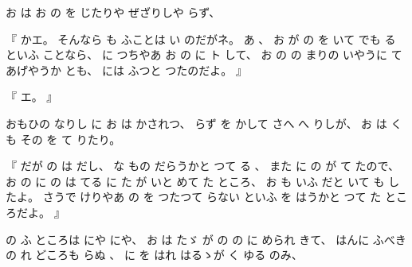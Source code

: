 %
お
は
お
の
を
じたりや
ぜざりしや
らず、

%
『
かエ。
%
そんなら
も
ふことは
い
のだがネ。
%
あ
、
%
お
が
の
を
いて
でも
る
といふ
ことなら、
%
に
つちやあ
お
の
に
ト
して、
%
お
の
の
まりの
いやうに
て
あげやうか
とも、
には
ふつと
つたのだよ。
』

%
『
エ。
』

%
おもひの
なりし
に
お
は
かされつ、
%
らず
を%
かして
さへ
へ
りしが、
%
お
は
くも
その
を
て
りたり。

%
『
だが
の
は
だし、%
%
な
もの
だらうかと
つて
る
、
%
また
に
の
が
て
たので、
%
お
の
に
の
は
てる
に
た
が
いと
めて
た
ところ、
%
お
も
いふ
だと
いて
も
したよ。
%
さうで
けりやあ
の
を
つたつて
らない
といふ
を
はうかと
つて
た
ところだよ。
』

%
の
ふ
ところは
にや
にや、
%
お
は
たゞ
が
の
の
に
められ
きて、
%
はんに
ふべき
の
れ
どころも
らぬ
、
%
に
を%
はれ
はるゝが
く
ゆる
のみ、

